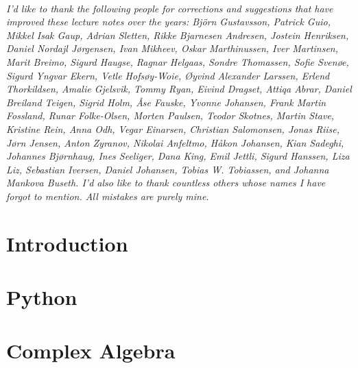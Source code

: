 \documentclass{tufte-book}
\begin{document}
\cleardoublepage
~\vfill
\begin{doublespace}
\noindent\fontsize{10}{10}\selectfont\itshape
\nohyphenation
I'd like to thank the following people for corrections and suggestions
that have improved these lecture notes over the years: Björn
Gustavsson, Patrick Guio,
Mikkel Isak Gaup, Adrian Sletten,
Rikke Bjarnesen Andresen, Jostein Henriksen, Daniel Nordajl Jørgensen,
Ivan Mikheev, Oskar Marthinussen, Iver Martinsen, Marit Breimo, Sigurd
Haugse, Ragnar Helgaas, Sondre Thomassen, Sofie Svenøe, Sigurd Yngvar
Ekern, Vetle Hofsøy-Woie, Øyvind Alexander Larssen, Erlend
Thorkildsen, Amalie Gjelsvik, Tommy Ryan, Eivind Dragset, Attiqa
Abrar, Daniel Breiland Teigen, Sigrid Holm, Åse Fauske, Yvonne
Johansen, Frank Martin Fossland, Runar Folke-Olsen, Morten Paulsen,
Teodor Skotnes,
Martin Stave, Kristine Rein, Anna Odh, Vegar
Einarsen, Christian Salomonsen, Jonas Riise, Jørn Jensen, Anton
Zyranov, Nikolai Anfeltmo, Håkon Johansen, Kian Sadeghi, Johannes
Bjørnhaug, Ines Seeliger, Dana King, Emil Jettli, Sigurd Hanssen, Liza
Liz, Sebastian Iversen, Daniel Johansen, Tobias W. Tobiassen, and
Johanna Mankova Buseth. I'd also like to thank countless others whose
names I have forgot to mention. All mistakes are purely mine.
\end{doublespace}
\vfill
\vfill





\cleardoublepage


\ifSpIntro
\chapter{Introduction}

\fi

\ifSpPython
\chapter{Python} 


\fi

\ifSpComplex
\chapter{Complex Algebra}



\fi
\end{document}
